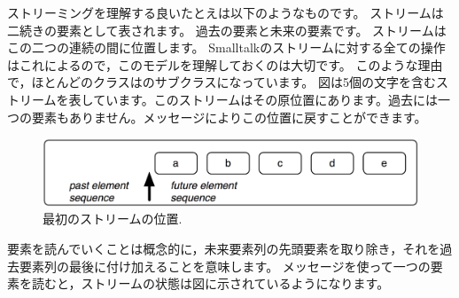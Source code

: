 \documentclass[a4paper,10pt,twoside]{book}
\begin{document}
ストリーミングを理解する良いたとえは以下のようなものです。
ストリームは二続きの要素として表されます。
過去の要素と未来の要素です。
ストリームはこの二つの連続の間に位置します。
Smalltalkのストリームに対する全ての操作はこれによるので，このモデルを理解しておくのは大切です。
このような理由で，ほとんどのクラスはのサブクラスになっています。
図は5個の文字を含むストリームを表しています。このストリームはその原位置にあります。\ie 過去には一つの要素もありません。メッセージによりこの位置に戻すことができます。



\begin{figure}[ht]
\centerline{\includegraphics[scale=0.5]{_abcdeStef}}
\caption{最初のストリームの位置.}
\vspace{.2in}
\end{figure}

要素を読んでいくことは概念的に，未来要素列の先頭要素を取り除き，それを過去要素列の最後に付け加えることを意味します。
メッセージを使って一つの要素を読むと，ストリームの状態は図に示されているようになります。
\end{document}

